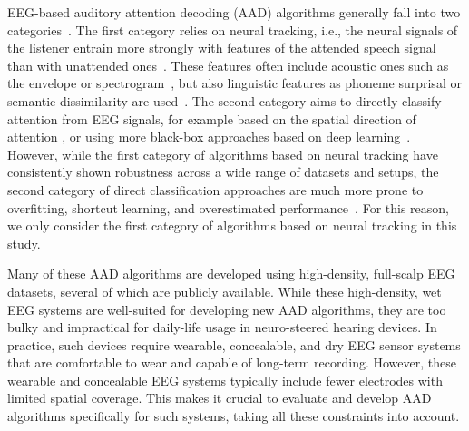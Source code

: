 \documentclass[fleqn,10pt]{wlscirep}
\begin{document}
	EEG-based auditory attention decoding (AAD) algorithms generally fall into two categories~\cite{geirnaert2021eegBased}. The first category relies on neural tracking, i.e., the neural signals of the listener entrain more strongly with features of the attended speech signal than with unattended ones~\cite{mesgarani2012selective,ding2012emergence,osullivan2014attentional}. These features often include acoustic ones such as the envelope or spectrogram~\cite{mesgarani2012selective,ding2012emergence,osullivan2014attentional}, but also linguistic features as phoneme surprisal or semantic dissimilarity are used~\cite{diLiberto2015low,gillis2021neural}. The second category aims to directly classify attention from EEG signals, for example based on the spatial direction of attention \cite{geirnaert2020fast,vandecappelle2021eeg,geirnaert2021riemannian}, or using more black-box approaches based on deep learning~\cite{geirnaert2021eegBased,puffay2023relating,nguyen2024aadnet}. However, while the first category of algorithms based on neural tracking have consistently shown robustness across a wide range of datasets and setups, the second category of direct classification approaches are much more prone to overfitting, shortcut learning, and overestimated performance~\cite{geirnaert2021eegBased,puffay2023relating,rotaru2023what,ivucic2024impact,yan25overestimated}. For this reason, we only consider the first category of algorithms based on neural tracking in this study.
	
	Many of these AAD algorithms are developed using high-density, full-scalp EEG datasets, several of which are publicly available. While these high-density, wet EEG systems are well-suited for developing new AAD algorithms, they are too bulky and impractical for daily-life usage in neuro-steered hearing devices. In practice, such devices require wearable, concealable, and dry EEG sensor systems that are comfortable to wear and capable of long-term recording. However, these wearable and concealable EEG systems typically include fewer electrodes with limited spatial coverage. This makes it crucial to evaluate and develop AAD algorithms specifically for such systems, taking all these constraints into account.
	
\end{document}
